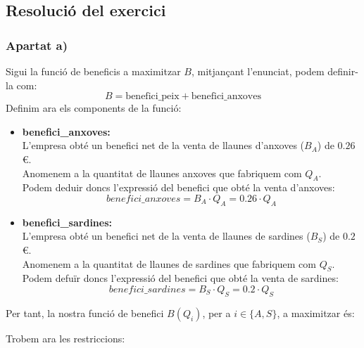 \documentclass[a4paper, 11pt]{article}
\begin{document}
\subsection{Resolució del exercici}
\subsubsection{Apartat a)}
Sigui la funció de beneficis a maximitzar $B$, mitjançant l'enunciat, podem definir-la com:
$$B = \text{benefici\_peix} + \text{benefici\_anxoves}$$
Definim ara els components de la funció:
\begin{itemize}
    \item \textbf{benefici\_anxoves:}\\
    L'empresa obté un benefici net de la venta de llaunes d'anxoves ($B_A$) de $0.26$\euro.\\
    Anomenem a la quantitat de llaunes anxoves que fabriquem com $Q_A$.\\
    Podem deduir doncs l'expressió del benefici que obté la venta d'anxoves:
    $$benefici\_anxoves = B_A \cdot Q_A = 0.26 \cdot Q_A$$
    
    \item \textbf{benefici\_sardines:}\\
    L'empresa obté un benefici net de la venta de llaunes de sardines ($B_S$) de $0.2$\euro.\\
    Anomenem a la quantitat de llaunes de sardines que fabriquem com $Q_S$.\\
    Podem defuïr doncs l'expressió del benefici que obté la venta de sardines:
    $$benefici\_sardines = B_S \cdot Q_S = 0.2 \cdot Q_S$$
\end{itemize}
Per tant, la nostra funció de benefici $B(Q_i)$, per a $i\in\{A,S\}$, a maximitzar és:
\begin{center}
\end{center}
Trobem ara les restriccions:
\end{document}
